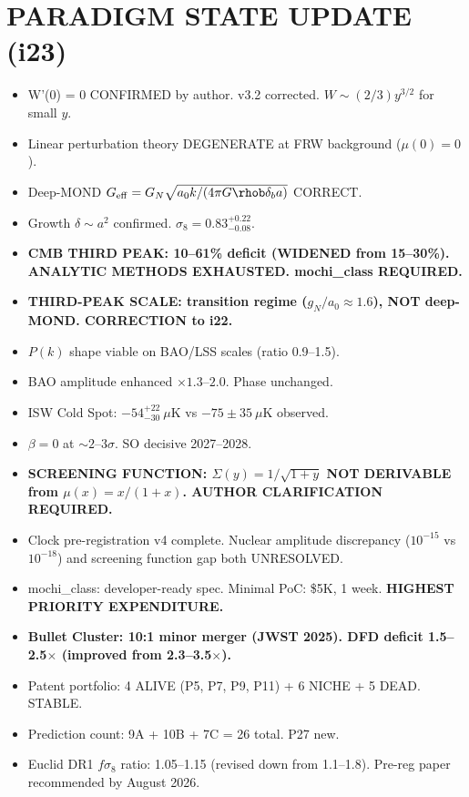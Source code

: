 \documentclass[11pt]{article}
\newcommand{\Geff}{G_{\rm eff}}
\newcommand{\aM}{a_0}
\begin{document}
\section{PARADIGM STATE UPDATE (i23)}

\begin{tcolorbox}[colback=green!5!white, colframe=green!70!black,
  title=\textbf{PARADIGM STATE (i23)}]

\begin{itemize}
\item W'(0) = 0 CONFIRMED by author. v3.2 corrected. $W \sim (2/3)y^{3/2}$
  for small $y$.
\item Linear perturbation theory DEGENERATE at FRW background ($\mu(0) = 0$).
\item Deep-MOND $\Geff = G_N\sqrt{\aM k/(4\pi G\rhob\delta_b a)}$ CORRECT.
\item Growth $\delta \sim a^2$ confirmed.  $\sigma_8 = 0.83^{+0.22}_{-0.08}$.
\item \textbf{CMB THIRD PEAK: 10--61\% deficit (WIDENED from 15--30\%).
  ANALYTIC METHODS EXHAUSTED.  mochi\_class REQUIRED.}
\item \textbf{THIRD-PEAK SCALE: transition regime ($g_N/\aM \approx 1.6$),
  NOT deep-MOND.  CORRECTION to i22.}
\item $P(k)$ shape viable on BAO/LSS scales (ratio 0.9--1.5).
\item BAO amplitude enhanced $\times 1.3$--$2.0$.  Phase unchanged.
\item ISW Cold Spot: $-54^{+22}_{-30}~\mu$K vs $-75 \pm 35~\mu$K observed.
\item $\beta = 0$ at $\sim 2$--$3\sigma$.  SO decisive 2027--2028.
\item \textbf{SCREENING FUNCTION: $\Sigma(y) = 1/\sqrt{1+y}$ NOT DERIVABLE
  from $\mu(x) = x/(1+x)$.  AUTHOR CLARIFICATION REQUIRED.}
\item Clock pre-registration v4 complete.  Nuclear amplitude discrepancy
  ($10^{-15}$ vs $10^{-18}$) and screening function gap both UNRESOLVED.
\item mochi\_class: developer-ready spec.  Minimal PoC: \$5K, 1 week.
  \textbf{HIGHEST PRIORITY EXPENDITURE.}
\item \textbf{Bullet Cluster: 10:1 minor merger (JWST 2025).  DFD deficit
  1.5--2.5$\times$ (improved from 2.3--3.5$\times$).}
\item Patent portfolio: 4 ALIVE (P5, P7, P9, P11) + 6 NICHE + 5 DEAD.
  STABLE.
\item Prediction count: 9A + 10B + 7C = 26 total.  P27 new.
\item Euclid DR1 $f\sigma_8$ ratio: 1.05--1.15 (revised down from
  1.1--1.8).  Pre-reg paper recommended by August 2026.
\end{itemize}

\end{tcolorbox}
\end{document}
